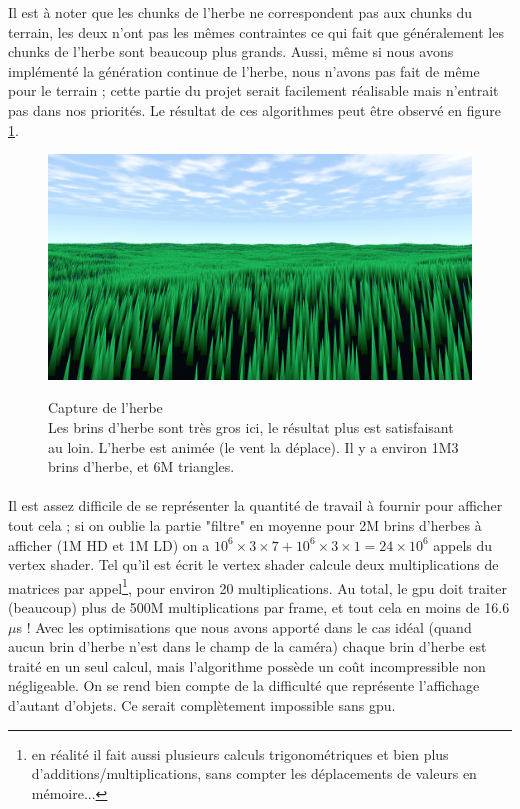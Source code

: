 \documentclass{EPUProjetDi}
\begin{document}
Il est à noter que les chunks de l'herbe ne correspondent pas aux chunks du terrain, les deux n'ont pas les mêmes contraintes ce qui fait que généralement les chunks de l'herbe sont beaucoup plus grands. Aussi, même si nous avons implémenté la génération continue de l'herbe, nous n'avons pas fait de même pour le terrain ; cette partie du projet serait facilement réalisable mais n'entrait pas dans nos priorités. Le résultat de ces algorithmes peut être observé en figure \ref{fig:grass}.

\begin{figure}
	\centering
	\caption[Capture de l'herbe]{Capture de l'herbe\\Les brins d'herbe sont très gros ici, le résultat plus est satisfaisant au loin. L'herbe est animée (le vent la déplace). Il y a environ 1M3 brins d'herbe, et 6M triangles.}
	\includegraphics[scale=.35]{grass}
	\label{fig:grass}
\end{figure}

\paragraph{}
Il est assez difficile de se représenter la quantité de travail à fournir pour afficher tout cela ; si on oublie la partie "filtre" en moyenne pour 2M brins d'herbes à afficher (1M HD et 1M LD) on a $10^6\times3\times7 + 10^6\times3\times1=24\times10^6$ appels du vertex shader. Tel qu'il est écrit le vertex shader calcule deux multiplications de matrices par appel\footnote{en réalité il fait aussi plusieurs calculs trigonométriques et bien plus d'additions/multiplications, sans compter les déplacements de valeurs en mémoire...}, pour environ 20 multiplications. Au total, le gpu doit traiter (beaucoup) plus de 500M multiplications par frame, et tout cela en moins de 16.6$\mu$s ! Avec les optimisations que nous avons apporté dans le cas idéal (quand aucun brin d'herbe n'est dans le champ de la caméra) chaque brin d'herbe est traité en un seul calcul, mais l'algorithme possède un coût incompressible non négligeable. On se rend bien compte de la difficulté que représente l'affichage d'autant d'objets. Ce serait complètement impossible sans gpu.
\end{document}
